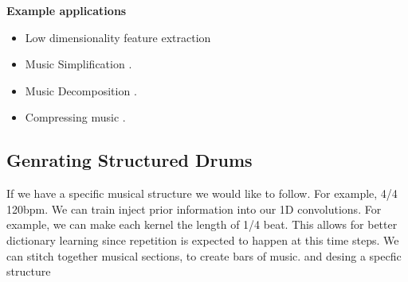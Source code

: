 \documentclass[11pt,a4paper]{article}
\begin{document}
\textbf{Example applications} 
\begin{itemize}
\item Low dimensionality feature extraction 
\item Music Simplification \cite{Ando2005}.
\item Music Decomposition \cite{Ando2005}.
\item Compressing music \cite{borsch2011}.
\end{itemize}



\subsection{Genrating Structured Drums}

If we have a specific musical structure we would like to follow. For example, 4/4 120bpm. We can train inject prior information into our 1D convolutions. For example, we can make each kernel the length of 1/4 beat. This allows for better dictionary learning since repetition is expected to happen at this time steps. We can stitch together musical sections, to create bars of music. and desing a specfic structure 



%

\end{document}
